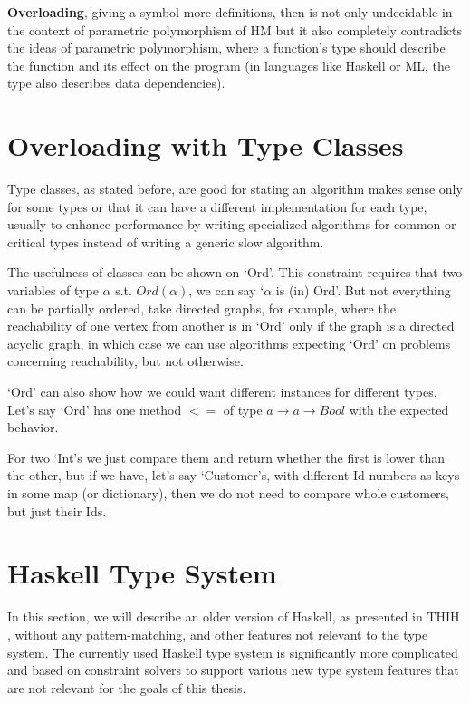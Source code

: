 \textbf{Overloading}, giving a symbol more definitions, then is not only undecidable in the context of parametric polymorphism of HM but it also completely contradicts the ideas of parametric polymorphism, where a function's type should describe the function and its effect on the program (in languages like Haskell or ML, the type also describes data dependencies). \cite{palsberg2012overloading}

\section{Overloading with Type Classes}

Type classes, as stated before, are good for stating an algorithm makes sense only for some types or that it can have a different implementation for each type, usually to enhance performance by writing specialized algorithms for common or critical types instead of writing a generic slow algorithm.

The usefulness of classes can be shown on `Ord'. This constraint requires that two variables of type $\alpha$ s.t. $Ord(\alpha)$, we can say `$\alpha$ is (in) Ord'. But not everything can be partially ordered, take directed graphs, for example, where the reachability of one vertex from another is in `Ord' only if the graph is a directed acyclic graph, in which case we can use algorithms expecting `Ord' on problems concerning reachability, but not otherwise.

`Ord' can also show how we could want different instances for different types. Let's say `Ord' has one method $<=$ of type $a \rightarrow a \rightarrow Bool$ with the expected behavior.

For two `Int's we just compare them and return whether the first is lower than the other, but if we have, let's say `Customer's, with different Id numbers as keys in some map (or dictionary), then we do not need to compare whole customers, but just their Ids.

\section{Haskell Type System}

In this section, we will describe an older version of Haskell, as presented in THIH \cite{jones1999typing}, without any pattern-matching, and other features not relevant to the type system. The currently used Haskell type system is significantly more complicated and based on constraint solvers to support various new type system features that are not relevant for the goals of this thesis.

